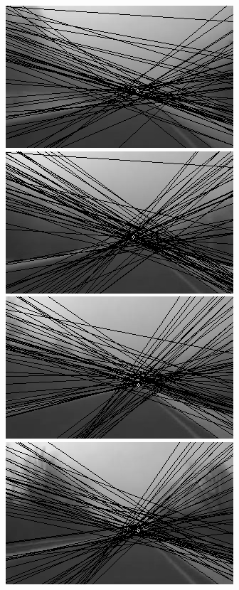 \documentclass[12pt]{report}
\begin{document}
\begin{figure}[H]
\begin{minipage}[c]{0.5\linewidth}
	\centering
	\includegraphics[scale=\imTrackScale]{images/bF_0000_50.png}
	\includegraphics[scale=\imTrackScale]{images/bF_0020_50.png}
	\includegraphics[scale=\imTrackScale]{images/bF_0040_50.png}
	\includegraphics[scale=\imTrackScale]{images/bF_0060_50.png}
\end{minipage}
\begin{minipage}[c]{0.5\linewidth}

\end{minipage}
\end{figure}
\end{document}
